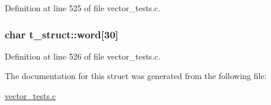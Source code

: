 Definition at line 525 of file vector\_\-tests.c.

\hypertarget{structt__struct_ab5b290b572fc4036f1e5efc671098c7f}{
\subsubsection[{word}]{\setlength{\rightskip}{0pt plus 5cm}char {\bf t\_\-struct::word}\mbox{[}30\mbox{]}}}
\label{structt__struct_ab5b290b572fc4036f1e5efc671098c7f}


Definition at line 526 of file vector\_\-tests.c.



The documentation for this struct was generated from the following file:\begin{DoxyCompactItemize}
\item 
\hyperlink{vector__tests_8c}{vector\_\-tests.c}\end{DoxyCompactItemize}
